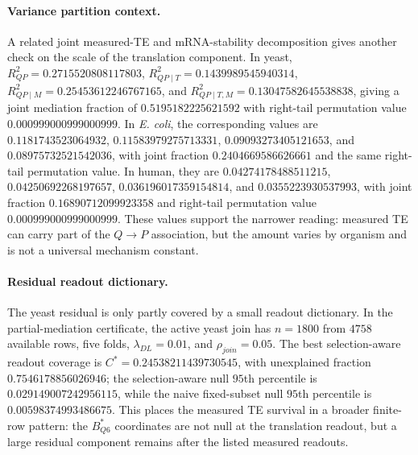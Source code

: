 \paragraph{Variance partition context.}
A related joint measured-TE and mRNA-stability decomposition gives another check on the scale of the translation component.  In yeast, $R^2_{QP}=0.2715520808117803$, $R^2_{QP\mid T}=0.1439989545940314$, $R^2_{QP\mid M}=0.25453612246767165$, and $R^2_{QP\mid T,M}=0.13047582645538838$, giving a joint mediation fraction of $0.5195182225621592$ with right-tail permutation value $0.000999000999000999$.  In \emph{E. coli}, the corresponding values are $0.1181743523064932$, $0.11583979275713331$, $0.09093273405121653$, and $0.08975732521542036$, with joint fraction $0.2404669586626661$ and the same right-tail permutation value.  In human, they are $0.04274178488511215$, $0.04250692268197657$, $0.036196017359154814$, and $0.0355223930537993$, with joint fraction $0.16890712099923358$ and right-tail permutation value $0.000999000999000999$.  These values support the narrower reading: measured TE can carry part of the $Q\to P$ association, but the amount varies by organism and is not a universal mechanism constant.

\paragraph{Residual readout dictionary.}
The yeast residual is only partly covered by a small readout dictionary.  In the partial-mediation certificate, the active yeast join has $n=1800$ from $4758$ available rows, five folds, $\lambda_{DL}=0.01$, and $\rho_{join}=0.05$.  The best selection-aware readout coverage is $C^{\ast}=0.24538211439730545$, with unexplained fraction $0.7546178856026946$; the selection-aware null $95$th percentile is $0.029149007242956115$, while the naive fixed-subset null $95$th percentile is $0.00598374993486675$.  This places the measured TE survival in a broader finite-row pattern: the $B^{\ast}_{Q6}$ coordinates are not null at the translation readout, but a large residual component remains after the listed measured readouts.

